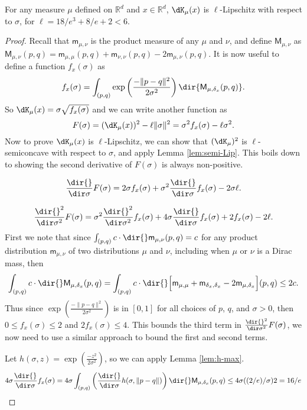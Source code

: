\documentclass[11pt]{myclass}
\begin{document}
\begin{theorem}
\label{thm:sigma-Lip}
For any measure $\mu$ defined on $\mathbb{R}^d$ and $x \in \mathbb{R}^d$, $\dK_\mu(x)$ is $\ell$-Lipschitz with respect to $\sigma$, for $\ell = 18/e^3 + 8/e + 2 < 6$.
\end{theorem}
\begin{proof}
Recall that $\textsf{m}_{\mu,\nu}$ is the product measure of any $\mu$ and $\nu$, and
define $\textsf{M}_{\mu,\nu}$ as $\textsf{M}_{\mu,\nu}(p,q) = \textsf{m}_{\mu,\mu}(p,q) + \textsf{m}_{\nu,\nu}(p,q) - 2 \textsf{m}_{\mu,\nu}(p,q)$.  
It is now useful to define a function $f_x(\sigma)$ as  
\[
f_x(\sigma) = \int_{(p,q)} \exp\left(\frac{-\|p-q\|^2}{2\sigma^2}\right) \dir{\textsf{M}_{\mu,\delta_x}(p,q)}. 
\]
So $\dK_\mu(x) = \sigma \sqrt{f_x(\sigma)}$ and we can write another function as
\[
F(\sigma) = (\dK_\mu(x))^2 - \ell \|\sigma\|^2 = \sigma^2 f_x(\sigma) - \ell \sigma^2.  
\]
Now to prove  $\dK_\mu(x)$ is $\ell$-Lipschitz, we can show that $(\dK_\mu)^2$ is $\ell$-semiconcave with respect to $\sigma$, and apply Lemma \ref{lem:semi-Lip}.  This boils down to showing the second derivative of $F(\sigma)$ is always non-positive.  

\[
\frac{\dir{}}{\dir \sigma} F(\sigma) 
= 
2 \sigma f_x(\sigma)  + \sigma^2 \frac{\dir{}}{\dir \sigma} f_x(\sigma)  - 2 \sigma \ell.
\]

\[
\frac{\dir{}^2}{\dir \sigma^2} F(\sigma) 
= 
 \sigma^2 \frac{\dir{}^2}{\dir \sigma^2} f_x(\sigma)  +  4 \sigma \frac{\dir{}}{\dir \sigma} f_x(\sigma)  + 2 f_x(\sigma) - 2 \ell.
\]
First we note that since $\int_{(p,q)} c \cdot \dir{} \textsf{m}_{\mu,\nu}(p,q) = c$ for any product distribution $\textsf{m}_{\mu,\nu}$ of two distributions $\mu$ and $\nu$, including when $\mu$ or $\nu$ is a Dirac mass, then 
\[
\int_{(p,q)} c \cdot \dir{}\textsf{M}_{\mu,\delta_x}(p,q) = 
\int_{(p,q)} c \cdot \dir{}\Big[\textsf{m}_{\mu,\mu} + \textsf{m}_{\delta_x,\delta_x} - 2 \textsf{m}_{\mu,\delta_x}\Big] (p,q) \leq 2c.
\]
Thus since $\exp \left( \frac{-\|p-q\|^2}{2 \sigma^2} \right)$ is in $[0,1]$ for all choices of $p$, $q$, and $\sigma >0$, then $0 \leq f_x(\sigma) \leq 2$ and $2 f_x(\sigma) \leq 4$.  This bounds the third term in $\frac{\dir{}^2}{\dir \sigma^2} F(\sigma)$, we now need to use a similar approach to bound the first and second terms.  

Let $h(\sigma,z) = \exp\left(\frac{-z^2}{2 \sigma^2}\right)$, so we can apply Lemma \ref{lem:h-max}.
\[
4 \sigma \frac{\dir{}}{\dir \sigma} f_x(\sigma) 
=
 4 \sigma \int_{(p,q)} \left(\frac{\dir{}}{\dir \sigma} h(\sigma,\|p-q\|)\right) \dir{}\textsf{M}_{\mu,\delta_x}(p,q)
\leq  
4\sigma ((2/e)/\sigma) 2 = 16/e
\]




\end{proof}
\end{document}
